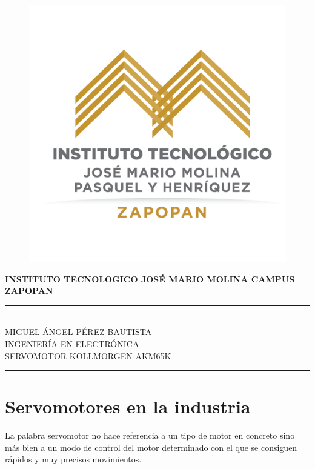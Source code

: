 \documentclass[12pt,titlepage]{article}
\begin{document}

\begin{titlepage} %
\begin{center}



\begin{figure}[htbp]
\hspace*{4.0cm} 
\includegraphics[scale=0.25]{Tec_logo}
\end{figure}


\hspace{17mm}\textbf{INSTITUTO TECNOLOGICO JOSÉ MARIO MOLINA \newline
CAMPUS ZAPOPAN}\\[10mm]
 \rule{\linewidth}{1.0mm} 
 \newline
 \uppercase{\\ Miguel ángel pérez bautista}\\[2.5mm]
 \uppercase{ingeniería en electrónica}\\[2.5mm]
 \uppercase{Servomotor Kollmorgen AKM65K}\\[5mm]
 \rule{\linewidth}{1.0mm} 
\end{center}
\end{titlepage}

\section{Servomotores en la industria}
La palabra servomotor no hace referencia a un tipo de motor en concreto sino más bien a un modo de control del motor determinado con el que se consiguen rápidos y muy precisos movimientos. \\
\end{document}
